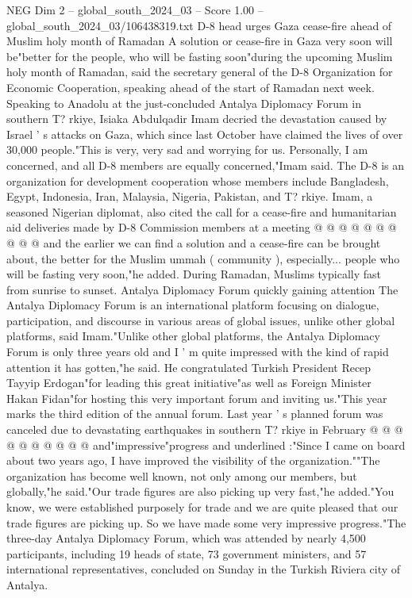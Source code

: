 \begin{textsample}{NEG Dim 2 – global\_south\_2024\_03 – Score 1.00 – global\_south\_2024\_03/106438319.txt}  \label{ex:f2_neg_109}
D-8 head urges Gaza cease-fire ahead of Muslim holy month of Ramadan A solution or cease-fire in Gaza very soon will be"better for the people, who will be fasting soon"during the upcoming Muslim holy month of Ramadan, said the secretary general of the D-8 Organization for Economic Cooperation, speaking ahead of the start of Ramadan next week.
Speaking to Anadolu at the just-concluded Antalya Diplomacy Forum in southern T? rkiye, Isiaka Abdulqadir Imam decried the devastation caused by Israel ' s attacks on Gaza, which since last October have claimed the lives of over 30,000 people."This is very, very sad and worrying for us.
Personally, I am concerned, and all D-8 members are equally concerned,"Imam said.
The D-8 is an organization for development cooperation whose members include Bangladesh, Egypt, Indonesia, Iran, Malaysia, Nigeria, Pakistan, and T? rkiye.
Imam, a seasoned Nigerian diplomat, also cited the call for a cease-fire and humanitarian aid deliveries made by D-8 Commission members at a meeting @ @ @ @ @ @ @ @ @ @ and the earlier we can find a solution and a cease-fire can be brought about, the better for the Muslim ummah ( community ), especially... people who will be fasting very soon,"he added.
During Ramadan, Muslims typically fast from sunrise to sunset.
Antalya Diplomacy Forum quickly gaining attention The Antalya Diplomacy Forum is an international platform focusing on dialogue, participation, and discourse in various areas of global issues, unlike other global platforms, said Imam."Unlike other global platforms, the Antalya Diplomacy Forum is only three years old and I ' m quite impressed with the kind of rapid attention it has gotten,"he said.
He congratulated Turkish President Recep Tayyip Erdogan"for leading this great initiative"as well as Foreign Minister Hakan Fidan"for hosting this very important forum and inviting us."This year marks the third edition of the annual forum.
Last year ' s planned forum was canceled due to devastating earthquakes in southern T? rkiye in February @ @ @ @ @ @ @ @ @ @ and"impressive"progress and underlined :"Since I came on board about two years ago, I have improved the visibility of the organization.""The organization has become well known, not only among our members, but globally,"he said."Our trade figures are also picking up very fast,"he added."You know, we were established purposely for trade and we are quite pleased that our trade figures are picking up.
So we have made some very impressive progress."The three-day Antalya Diplomacy Forum, which was attended by nearly 4,500 participants, including 19 heads of state, 73 government ministers, and 57 international representatives, concluded on Sunday in the Turkish Riviera city of Antalya.

\end{textsample}
